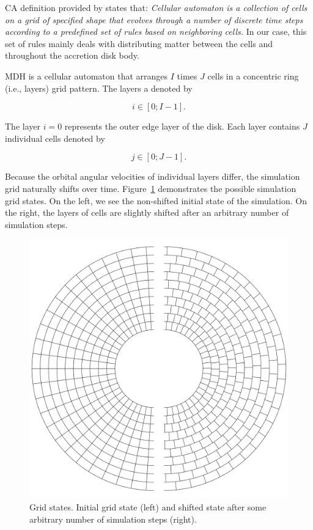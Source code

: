    CA definition provided by \citep{wolfram2002} states that: \emph{Cellular automaton is a collection of cells on a grid of specified shape that evolves through a number of discrete time steps according to a predefined set of rules based on neighboring cells.} In our case, this set of rules mainly deals with distributing matter between the cells and throughout the accretion disk body.

    MDH is a cellular automaton that arranges $I$ times $J$ cells in a concentric ring (i.e., layers) grid pattern. The layers a denoted by 

    \begin{equation}
        i \in [0;I-1].
    \end{equation}

    The layer $i=0$ represents the outer edge layer of the disk. Each layer contains $J$ individual cells denoted by

    \begin{equation}
        j \in [0;J-1].
    \end{equation}

    Because the orbital angular velocities of individual layers differ, the simulation grid naturally shifts over time. Figure~\ref{fig:grid_states} demonstrates the possible simulation grid states. On the left, we see the non-shifted initial state of the simulation. On the right, the layers of cells are slightly shifted after an arbitrary number of simulation steps.

    \begin{figure}[H]
    \centering
    \includegraphics[width=\columnwidth]{img/grid_states.pdf}
    \caption{Grid states. Initial grid state (left) and shifted state after some arbitrary number of simulation steps (right).}
    \label{fig:grid_states}
    \end{figure}

